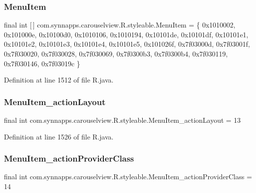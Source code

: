 \subsubsection{\texorpdfstring{MenuItem}{MenuItem}}
{\footnotesize\ttfamily final int \mbox{[}$\,$\mbox{]} com.\+synnapps.\+carouselview.\+R.\+styleable.\+Menu\+Item = \{ 0x1010002, 0x101000e, 0x10100d0, 0x1010106, 0x1010194, 0x10101de, 0x10101df, 0x10101e1, 0x10101e2, 0x10101e3, 0x10101e4, 0x10101e5, 0x101026f, 0x7f03000d, 0x7f03001f, 0x7f030020, 0x7f030028, 0x7f030069, 0x7f0300b3, 0x7f0300b4, 0x7f030119, 0x7f030146, 0x7f03019c \}\hspace{0.3cm}{\ttfamily [static]}}



Definition at line 1512 of file R.\+java.

\mbox{\label{classcom_1_1synnapps_1_1carouselview_1_1_r_1_1styleable_a458d221799730fd71be7d9093360724a}} 
\subsubsection{\texorpdfstring{MenuItem\_actionLayout}{MenuItem\_actionLayout}}
{\footnotesize\ttfamily final int com.\+synnapps.\+carouselview.\+R.\+styleable.\+Menu\+Item\+\_\+action\+Layout = 13\hspace{0.3cm}{\ttfamily [static]}}



Definition at line 1526 of file R.\+java.

\mbox{\label{classcom_1_1synnapps_1_1carouselview_1_1_r_1_1styleable_a58b787a184650bf5e9315a5296431bad}} 
\subsubsection{\texorpdfstring{MenuItem\_actionProviderClass}{MenuItem\_actionProviderClass}}
{\footnotesize\ttfamily final int com.\+synnapps.\+carouselview.\+R.\+styleable.\+Menu\+Item\+\_\+action\+Provider\+Class = 14\hspace{0.3cm}{\ttfamily [static]}}



